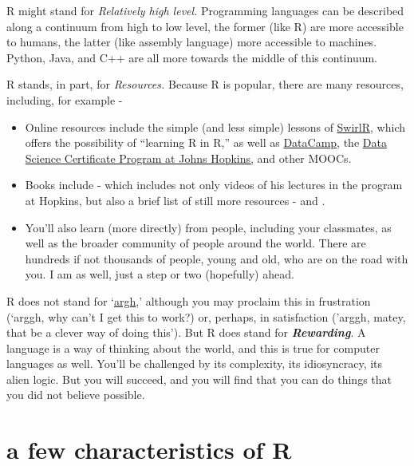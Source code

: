 \documentclass[openany]{book}
\providecommand{\tightlist}{%
  \setlength{\itemsep}{0pt}\setlength{\parskip}{0pt}}
\begin{document}
R might stand for \emph{Relatively high level.} Programming languages can be described along a continuum from high to low level, the former (like R) are more accessible to humans, the latter (like assembly language) more accessible to machines. Python, Java, and C++ are all more towards the middle of this continuum.

R stands, in part, for \emph{Resources.} Because R is popular, there are many resources, including, for example -

\begin{itemize}
\tightlist
\item
  Online resources include the simple (and less simple) lessons of \href{http://swirlstats.com/}{SwirlR}, which offers the possibility of ``learning R in R,'' as well as \href{https://www.datacamp.com/home}{DataCamp}, the \href{https://www.coursera.org/specializations/jhu-data-science}{Data Science Certificate Program at Johns Hopkins,} and other MOOCs.\\
\item
  Books include \citet{peng2015r} - which includes not only videos of his lectures in the program at Hopkins, but also a brief list of still more resources - and \citet{wickham2016r}.
\item
  You'll also learn (more directly) from people, including your classmates, as well as the broader community of people around the world. There are hundreds if not thousands of people, young and old, who are on the road with you. I am as well, just a step or two (hopefully) ahead.
\end{itemize}

R does not stand for `\href{https://www.urbandictionary.com/define.php?term=ARGH}{argh},' although you may proclaim this in frustration (`arggh, why can't I get this to work?) or, perhaps, in satisfaction ('arggh, matey, that be a clever way of doing this'). But R does stand for \textbf{\emph{Rewarding}}. A language is a way of thinking about the world, and this is true for computer languages as well. You'll be challenged by its complexity, its idiosyncracy, its alien logic. But you will succeed, and you will find that you can do things that you did not believe possible.

\hypertarget{a-few-characteristics-of-r}{%
\section{a few characteristics of R}\label{a-few-characteristics-of-r}}
\end{document}

